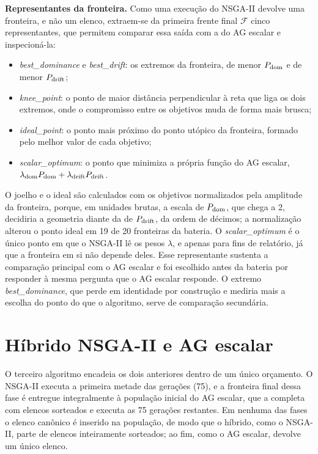 \textbf{Representantes da fronteira.} Como uma execução do NSGA-II devolve uma fronteira, e não um elenco, extraem-se da primeira frente final $\mathcal{F}$ cinco representantes, que permitem comparar essa saída com a do AG escalar e inspecioná-la:
\begin{itemize}
    \item \textit{best\_dominance} e \textit{best\_drift}: os extremos da fronteira, de menor $P_{\mathrm{dom}}$ e de menor $P_{\mathrm{drift}}$;
    \item \textit{knee\_point}: o ponto de maior distância perpendicular à reta que liga os dois extremos, onde o compromisso entre os objetivos muda de forma mais brusca;
    \item \textit{ideal\_point}: o ponto mais próximo do ponto utópico da fronteira, formado pelo melhor valor de cada objetivo;
    \item \textit{scalar\_optimum}: o ponto que minimiza a própria função do AG escalar, $\lambda_{\mathrm{dom}}P_{\mathrm{dom}} + \lambda_{\mathrm{drift}}P_{\mathrm{drift}}$.
\end{itemize}
O joelho e o ideal são calculados com os objetivos normalizados pela amplitude da fronteira, porque, em unidades brutas, a escala de $P_{\mathrm{dom}}$, que chega a 2, decidiria a geometria diante da de $P_{\mathrm{drift}}$, da ordem de décimos; a normalização alterou o ponto ideal em 19 de 20 fronteiras da bateria. O \textit{scalar\_optimum} é o único ponto em que o NSGA-II lê os pesos $\lambda$, e apenas para fins de relatório, já que a fronteira em si não depende deles. Esse representante sustenta a comparação principal com o AG escalar e foi escolhido antes da bateria por responder à mesma pergunta que o AG escalar responde. O extremo \textit{best\_dominance}, que perde em identidade por construção e mediria mais a escolha do ponto do que o algoritmo, serve de comparação secundária.

\section{Híbrido NSGA-II e AG escalar}
\label{sec: hibrido}

O terceiro algoritmo encadeia os dois anteriores dentro de um único orçamento. O NSGA-II executa a primeira metade das gerações (75), e a fronteira final dessa fase é entregue integralmente à população inicial do AG escalar, que a completa com elencos sorteados e executa as 75 gerações restantes. Em nenhuma das fases o elenco canônico é inserido na população, de modo que o híbrido, como o NSGA-II, parte de elencos inteiramente sorteados; ao fim, como o AG escalar, devolve um único elenco.

